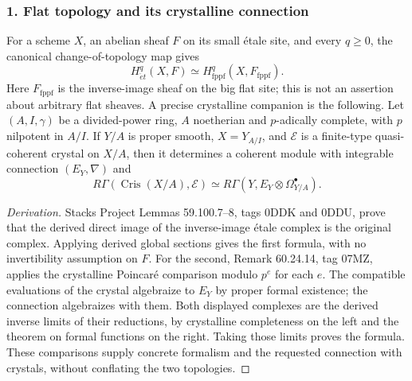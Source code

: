 \subsubsection{1. Flat topology and its crystalline connection}
\begin{proposition}\label{B:subject1}
For a scheme $X$, an abelian sheaf $F$ on its small \'etale site, and every $q\ge0$, the canonical change-of-topology map gives
\[
 H^q_{\acute et}(X,F)\simeq H^q_{\mathrm{fppf}}(X,F_{\mathrm{fppf}}).
\]
Here $F_{\mathrm{fppf}}$ is the inverse-image sheaf on the big flat site; this is not an assertion about arbitrary flat sheaves. A precise crystalline companion is the following. Let $(A,I,\gamma)$ be a divided-power ring, $A$ noetherian and $p$-adically complete, with $p$ nilpotent in $A/I$. If $Y/A$ is proper smooth, $X=Y_{A/I}$, and $\mathcal E$ is a finite-type quasi-coherent crystal on $X/A$, then it determines a coherent module with integrable connection $(E_Y,\nabla)$ and
\[
 R\Gamma(\operatorname{Cris}(X/A),\mathcal E)
 \simeq R\Gamma(Y,E_Y\otimes\Omega^\bullet_{Y/A}).
\]
\end{proposition}
\begin{proof}[Derivation]
Stacks Project Lemmas 59.100.7--8, tags 0DDK and 0DDU, prove that the derived direct image of the inverse-image \'etale complex is the original complex. Applying derived global sections gives the first formula, with no invertibility assumption on $F$. For the second, Remark 60.24.14, tag 07MZ, applies the crystalline Poincar\'e comparison modulo $p^e$ for each $e$. The compatible evaluations of the crystal algebraize to $E_Y$ by proper formal existence; the connection algebraizes with them. Both displayed complexes are the derived inverse limits of their reductions, by crystalline completeness on the left and the theorem on formal functions on the right. Taking those limits proves the formula. These comparisons supply concrete formalism and the requested connection with crystals, without conflating the two topologies.
\end{proof}

